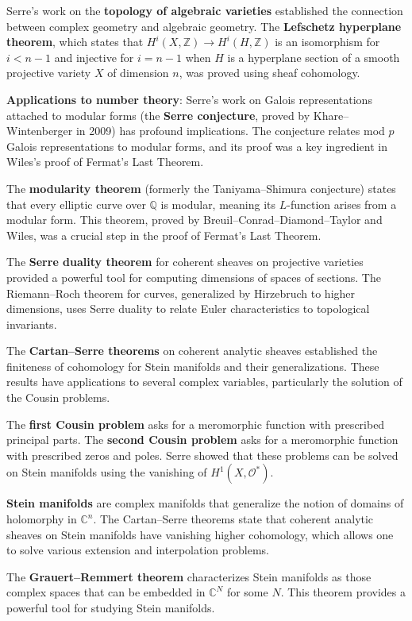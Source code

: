 Serre's work on the \textbf{topology of algebraic varieties} established the connection between complex geometry and algebraic geometry. The \textbf{Lefschetz hyperplane theorem}, which states that $H^i(X, \mathbb{Z}) \to H^i(H, \mathbb{Z})$ is an isomorphism for $i < n-1$ and injective for $i = n-1$ when $H$ is a hyperplane section of a smooth projective variety $X$ of dimension $n$, was proved using sheaf cohomology.

\textbf{Applications to number theory}: Serre's work on Galois representations attached to modular forms (the \textbf{Serre conjecture}, proved by Khare--Wintenberger in 2009) has profound implications. The conjecture relates mod $p$ Galois representations to modular forms, and its proof was a key ingredient in Wiles's proof of Fermat's Last Theorem.

The \textbf{modularity theorem} (formerly the Taniyama--Shimura conjecture) states that every elliptic curve over $\mathbb{Q}$ is modular, meaning its $L$-function arises from a modular form. This theorem, proved by Breuil--Conrad--Diamond--Taylor and Wiles, was a crucial step in the proof of Fermat's Last Theorem.

The \textbf{Serre duality theorem} for coherent sheaves on projective varieties provided a powerful tool for computing dimensions of spaces of sections. The Riemann--Roch theorem for curves, generalized by Hirzebruch to higher dimensions, uses Serre duality to relate Euler characteristics to topological invariants.

The \textbf{Cartan--Serre theorems} on coherent analytic sheaves established the finiteness of cohomology for Stein manifolds and their generalizations. These results have applications to several complex variables, particularly the solution of the Cousin problems.

The \textbf{first Cousin problem} asks for a meromorphic function with prescribed principal parts. The \textbf{second Cousin problem} asks for a meromorphic function with prescribed zeros and poles. Serre showed that these problems can be solved on Stein manifolds using the vanishing of $H^1(X, \mathcal{O}^*)$.

\textbf{Stein manifolds} are complex manifolds that generalize the notion of domains of holomorphy in $\mathbb{C}^n$. The Cartan--Serre theorems state that coherent analytic sheaves on Stein manifolds have vanishing higher cohomology, which allows one to solve various extension and interpolation problems.

The \textbf{Grauert--Remmert theorem} characterizes Stein manifolds as those complex spaces that can be embedded in $\mathbb{C}^N$ for some $N$. This theorem provides a powerful tool for studying Stein manifolds.

